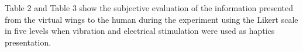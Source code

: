 \documentclass[letterpaper, 10 pt, conference]{ieeeconf}  %
\begin{document}
                        Table 2 and Table 3 show the subjective evaluation of the information presented from the virtual wings to the human during the experiment using the Likert scale in five levels when vibration and electrical stimulation were used as haptics presentation.  

                        \begin{table}[tb]
                                \begin{center}
                                    \caption{Results of an experiment using vibration as a haptics presentation}
                                \end{center}
                        \end{table}
                            
\end{document}
